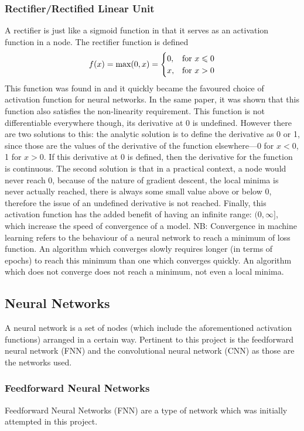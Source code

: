 \documentclass[a4paper,fleqn,usenatbib]{mnras}
\begin{document}
\subsubsection{Rectifier/Rectified Linear Unit}
\label{sec:ReLU}
A rectifier is just like a sigmoid function in that it serves as an activation function in a node. The rectifier function is defined
\begin{equation}
f(x)=\textnormal{max}(0,x)= \begin{cases} 0, & \mbox{for } x\leq0 \\ x, & \mbox{for } x>0 \end{cases}	
\end{equation}
This function was found in \citep{ReLu} and it quickly became the favoured choice of activation function for neural networks. In the same paper, it was shown that this function also satisfies the non-linearity requirement. This function is not differentiable everywhere though, its derivative at 0 is undefined. However there are two solutions to this: the analytic solution is to define the derivative as 0 or 1, since those are the values of the derivative of the function elsewhere---0 for $x<0$, 1 for $x>0$. If this derivative at 0 is defined, then the derivative for the function is continuous. The second solution is that in a practical context, a node would never reach 0, because of the nature of gradient descent, the local minima is never actually reached, there is always some small value above or below 0, therefore the issue of an undefined derivative is not reached. Finally, this activation function has the added benefit of having an infinite range: $(0,\infty]$, which increase the speed of convergence of a model. NB: Convergence in machine learning refers to the behaviour of a neural network to reach a minimum of loss function. An algorithm which converges slowly requires longer (in terms of epochs) to reach this minimum than one which converges quickly. An algorithm which does not converge does not reach a minimum, not even a local minima.

\subsection{Neural Networks}
A neural network is a set of nodes (which include the aforementioned activation functions) arranged in a certain way. Pertinent to this project is the feedforward neural network (FNN) and the convolutional neural network (CNN) as those are the networks used.
\subsubsection{Feedforward Neural Networks}
Feedforward Neural Networks (FNN) are a type of network which was initially attempted in this project.
\end{document}
